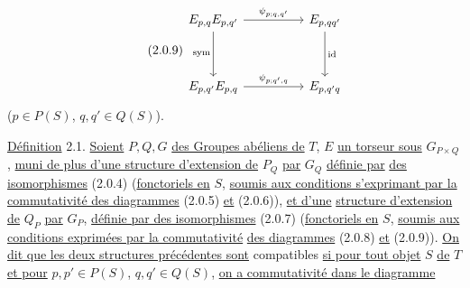 \begin{equation}\tag{2.0.9}
\begin{tikzcd}[column sep=huge, row sep=huge]
E_{p,q}E_{p,q'} \arrow[r, "{\psi_{p;q,q'}}"] \arrow[d, "\mathrm{sym}"'] & E_{p,qq'} \arrow[d, "\mathrm{id}"] \\
E_{p,q'}E_{p,q} \arrow[r, "{\psi_{p;q',q}}"] & E_{p,q'q}
\end{tikzcd}
\end{equation}
($p \in P(S)$, $q,q' \in Q(S)$).



\underline{Définition} 2.1. \underline{Soient} $P,Q,G$ \underline{des Groupes abéliens de} \underline{$T$}, $E$ \underline{un torseur sous}
$G_{P\times Q}$, \underline{muni de plus d'une structure d'extension de} $P_Q$ \underline{par} $G_Q$ \underline{définie par}
\underline{des isomorphismes} (2.0.4) (\underline{fonctoriels en} $S$, \underline{soumis aux conditions s'exprimant par la commutativité des diagrammes} (2.0.5) \underline{et} (2.0.6)), \underline{et d'une}
\underline{structure d'extension de} $Q_P$ \underline{par} $G_P$, \underline{définie par des isomorphismes} (2.0.7)
(\underline{fonctoriels en} $S$, \underline{soumis aux conditions exprimées par la commutativité}
\underline{des diagrammes} (2.0.8) \underline{et} (2.0.9)). \underline{On dit que les deux structures précédentes sont} compatibles \underline{si pour tout objet} $S$ \underline{de} \underline{$T$} \underline{et pour}
$p,p' \in P(S)$, $q,q' \in Q(S)$, \underline{on a commutativité dans le diagramme}

